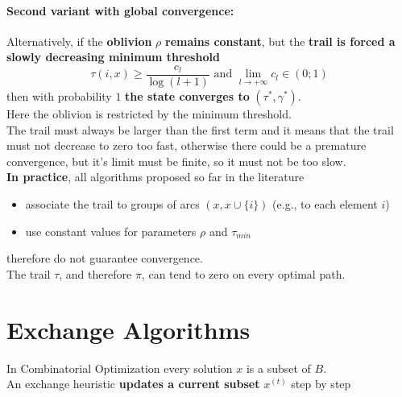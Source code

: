 \documentclass[11pt]{article}
\begin{document}
	\newpage
	
	\paragraph{Second variant with global convergence:} Alternatively, if the \textbf{oblivion} $\rho$ \textbf{remains constant}, but the \textbf{trail is forced a slowly decreasing minimum threshold}
	$$ \tau (i,x) \geq \frac{c_l}{\log(l+1)} \text{ and } \lim_{l \rightarrow + \infty} c_l \in (0;1)$$
	then with probability $1$ \textbf{the state converges to} $(\tau^\ast, \gamma^\ast)$.\\
	
	Here the oblivion is restricted by the minimum threshold.\\
	
	The trail must always be larger than the first term and it means that the trail must not decrease to zero too fast, otherwise there could be a premature convergence, but it's limit must be finite, so it must not be too slow.\\ 
	
	
	\textbf{In practice}, all algorithms proposed so far in the literature
	\begin{itemize}
		\item associate the trail to groups of arcs $(x, x \cup \{i\})$ (e.g., to each element $i$)
		
		\item use constant values for parameters $\rho$ and $\tau_{min}$
	\end{itemize}
	therefore do not guarantee convergence.\\
	
	The trail $\tau$, and therefore $\pi$, can tend to zero on every optimal path.\\
	
	
	\newpage
	
	\section{Exchange Algorithms}
	
	In Combinatorial Optimization every solution $x$ is a subset of $B$.\\
	
	An exchange heuristic \textbf{updates a current subset} $x^{(t)}$ step by step
	
\end{document}
